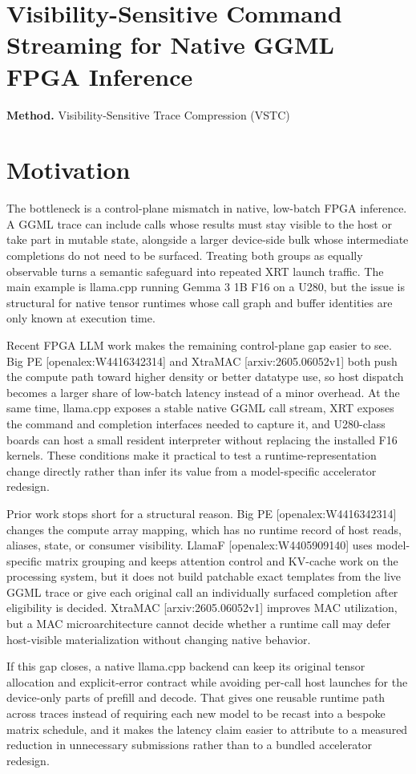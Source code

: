 \documentclass[10pt,a4paper]{article}
\begin{document}
\section*{Visibility-Sensitive Command Streaming for Native GGML FPGA Inference}
\textbf{Method.} Visibility-Sensitive Trace Compression (VSTC)
\section*{Motivation}
The bottleneck is a control-plane mismatch in native, low-batch FPGA inference. A GGML trace can include calls whose results must stay visible to the host or take part in mutable state, alongside a larger device-side bulk whose intermediate completions do not need to be surfaced. Treating both groups as equally observable turns a semantic safeguard into repeated XRT launch traffic. The main example is llama.cpp running Gemma 3 1B F16 on a U280, but the issue is structural for native tensor runtimes whose call graph and buffer identities are only known at execution time.

Recent FPGA LLM work makes the remaining control-plane gap easier to see. Big PE [openalex:W4416342314] and XtraMAC [arxiv:2605.06052v1] both push the compute path toward higher density or better datatype use, so host dispatch becomes a larger share of low-batch latency instead of a minor overhead. At the same time, llama.cpp exposes a stable native GGML call stream, XRT exposes the command and completion interfaces needed to capture it, and U280-class boards can host a small resident interpreter without replacing the installed F16 kernels. These conditions make it practical to test a runtime-representation change directly rather than infer its value from a model-specific accelerator redesign.

Prior work stops short for a structural reason. Big PE [openalex:W4416342314] changes the compute array mapping, which has no runtime record of host reads, aliases, state, or consumer visibility. LlamaF [openalex:W4405909140] uses model-specific matrix grouping and keeps attention control and KV-cache work on the processing system, but it does not build patchable exact templates from the live GGML trace or give each original call an individually surfaced completion after eligibility is decided. XtraMAC [arxiv:2605.06052v1] improves MAC utilization, but a MAC microarchitecture cannot decide whether a runtime call may defer host-visible materialization without changing native behavior.

If this gap closes, a native llama.cpp backend can keep its original tensor allocation and explicit-error contract while avoiding per-call host launches for the device-only parts of prefill and decode. That gives one reusable runtime path across traces instead of requiring each new model to be recast into a bespoke matrix schedule, and it makes the latency claim easier to attribute to a measured reduction in unnecessary submissions rather than to a bundled accelerator redesign.
\end{document}
